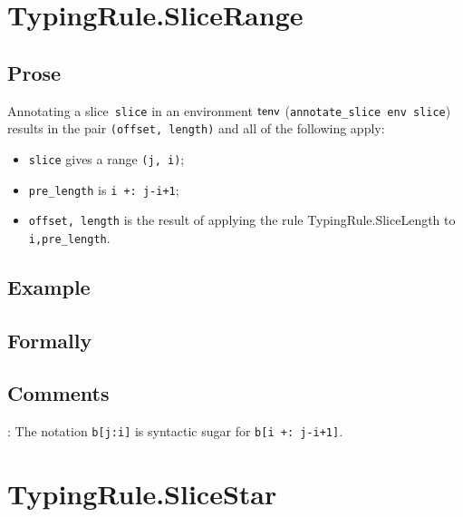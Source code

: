 \documentclass{book}
\begin{document}

\section{TypingRule.SliceRange \label{sec:TypingRule.SliceRange}}

  \subsection{Prose}
      Annotating a slice~\texttt{slice} in an environment $\textsf{tenv}$
(\texttt{annotate\_slice env slice}) results in the pair \texttt{(offset,
length)} and all of the following apply:
   \begin{itemize}
   \item \texttt{slice} gives a range \texttt{(j, i)};
   \item \texttt{pre\_length} is \texttt{i +: j-i+1};
   \item \texttt{offset, length} is the result of applying the rule TypingRule.SliceLength to \texttt{i,pre\_length}.
   \end{itemize}

  \subsection{Example}



\begin{emptyformal}
    \subsection{Formally}
\end{emptyformal}

\subsection{Comments}
    : The notation \texttt{b[j:i]} is syntactic sugar for \texttt{b[i +: j-i+1]}.

\section{TypingRule.SliceStar \label{sec:TypingRule.SliceStar}}
\end{document}
